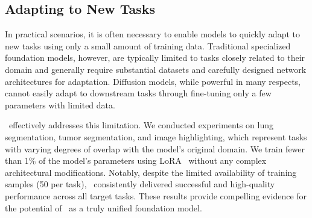 \subsection{Adapting to New Tasks}
In practical scenarios, it is often necessary to enable models to quickly adapt to new tasks using only a small amount of training data. Traditional specialized foundation models, however, are typically limited to tasks closely related to their domain and generally require substantial datasets and carefully designed network architectures for adaptation. 
Diffusion models, while powerful in many respects, cannot easily adapt to downstream tasks through fine-tuning only a few parameters with limited data.

\ours\ effectively addresses this limitation. We conducted experiments on lung segmentation, tumor segmentation, and image highlighting, which represent tasks with varying degrees of overlap with the model’s original domain.
We train fewer than 1\% of the model’s parameters using LoRA~\cite{hu2021lora} without any complex architectural modifications. Notably, despite the limited availability of training samples (50 per task), \ours\ consistently delivered successful and high-quality performance across all target tasks. These results provide compelling evidence for the potential of \ours\ as a truly unified foundation model.